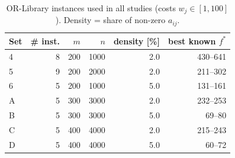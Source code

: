 \begin{table}[t]
\centering\small
\caption{OR-Library instances used in all studies (costs $w_j\in[1,100]$). Density = share of non-zero $a_{ij}$.}
\label{tab:instances}
\begin{tabular}{lrrrrr}
\toprule
Set & \# inst. & $m$ & $n$ & density [\%] & best known $f^*$ \\
\midrule
4 & 8 & 200 & 1000 & 2.0 & 430--641 \\
5 & 9 & 200 & 2000 & 2.0 & 211--302 \\
6 & 5 & 200 & 1000 & 5.0 & 131--161 \\
A & 5 & 300 & 3000 & 2.0 & 232--253 \\
B & 5 & 300 & 3000 & 5.0 & 69--80 \\
C & 5 & 400 & 4000 & 2.0 & 215--243 \\
D & 5 & 400 & 4000 & 5.0 & 60--72 \\
\bottomrule
\end{tabular}
\end{table}
